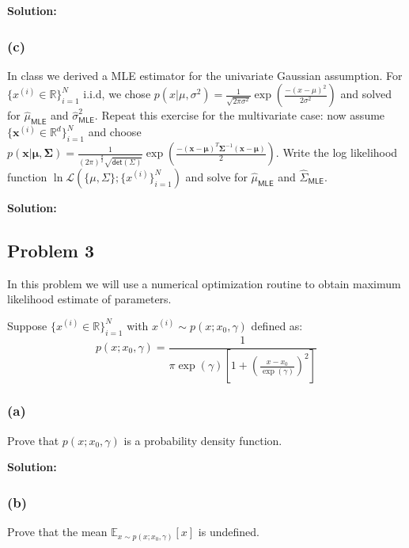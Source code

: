 \documentclass[11pt]{article}
\begin{document}
	{\noindent \bf Solution: }
	
	\vfill
	
\subsubsection*{(c)}
	In class we derived a MLE estimator for the univariate Gaussian assumption. For
	 $\{x^{(i)} \in \mathbb{R} \}_{i = 1}^N$ i.i.d, we chose $p(x | \mu, \sigma^2) = \frac{1}{\sqrt{2 \pi \sigma^2}}
	 \exp \left ( \frac{- (x - \mu)^2}{2 \sigma^2} \right )$ and solved for $\hat{\mu}_{\mathsf{MLE}}$
	 and $\hat{\sigma}^2_{\mathsf{MLE}}$. Repeat this exercise for the multivariate case:
	 now assume  $\{ \mathbf{x}^{(i)} \in \mathbb{R}^d \}_{i = 1}^N$ and
	 choose $p( \mathbf{x} | \mathbf{\mu}, \mathbf{\Sigma}) =
	 \frac{1}{ (2 \pi)^{\frac{d}{2}} \sqrt{ \mathsf{det}(\Sigma) }}
	 \exp \left ( \frac{- ( \mathbf{x} - \mathbf{\mu})^T
	 	\mathbf{\Sigma}^{-1} ( \mathbf{x} - \mathbf{\mu})
	 }{2} \right )$. Write the log likelihood function 
 	$\ln \mathcal{L}( \{ \mu, \Sigma \}; \{ x^{(i)}\}_{i = 1}^N
 	)$ and solve for $\hat{\mu}_{\mathsf{MLE}}$ and $\hat{\Sigma}_{\mathsf{MLE}}$.

{\noindent \bf Solution: }

\vfill
\clearpage

\subsection*{Problem 3}

In this problem we will use a numerical optimization routine to obtain maximum likelihood estimate
of parameters.

Suppose $\{ x^{(i) }\in \mathbb{R} \}_{i = 1}^N$ with $x^{(i)} \sim p(x ; x_0, \gamma)$
defined as:
$$p( x ; x_0, \gamma )= \frac{1}{\pi\exp( \gamma) \left [ 
	1 + \left( \frac{x - x_0}{\exp(\gamma)} \right)^2 \right ]}  $$


	\label{question:cauchy}
	\subsubsection*{(a)}
	Prove that $p( x ; x_0, \gamma )$ is a probability density function.
	
	{\noindent \bf Solution: }
	
	\vfill
	
	\subsubsection*{(b)}
	Prove that the mean $\mathbb{E}_{x \sim p( x ; x_0, \gamma )} \left [x \right ]$ is undefined.
	
\end{document}
